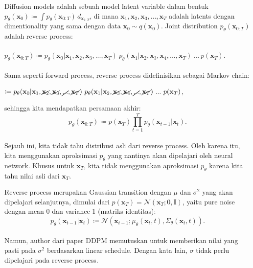 \documentclass{article}
\begin{document}
Diffusion models adalah sebuah model latent variable dalam bentuk $ p_\theta(\textbf{x}_0) \coloneq \int p_\theta(\textbf{x}_{0:T}) \,d_{\textbf{x}_{1:T}} $, di mana $ \textbf{x}_1,\textbf{x}_2,\textbf{x}_3,...,\textbf{x}_T $ adalah latents dengan dimentionality yang sama dengan data $ \textbf{x}_0 \sim q(\textbf{x}_0) $. Joint distribution $ p_\theta(\textbf{x}_{0:T}) $ adalah reverse process:
\\\\
$ p_\theta(\textbf{x}_{0:T}) \coloneq p_\theta(\textbf{x}_0|\textbf{x}_1,\textbf{x}_2,\textbf{x}_3,...,\textbf{x}_T) \ p_\theta(\textbf{x}_1|\textbf{x}_2,\textbf{x}_3,\textbf{x}_4,...,\textbf{x}_T) \ ... \  p(\textbf{x}_{T}) $.
\\\\
Sama seperti forward process, reverse process didefinisikan sebagai Markov chain:
\begin{tabbing}
\hspace{3.75em} $ \coloneq p_\theta(\textbf{x}_0|\textbf{x}_1,\cancel{\textbf{x}_2},\cancel{\textbf{x}_3},\cancel{...},\cancel{\textbf{x}_T}) \ p_\theta(\textbf{x}_1|\textbf{x}_2,\cancel{\textbf{x}_3},\cancel{\textbf{x}_4},\cancel{...},\cancel{\textbf{x}_T}) \ ... \  p(\textbf{x}_{T})  $,
\end{tabbing}
sehingga kita mendapatkan persamaan akhir:
\\
\begin{equation}
p_\theta(\textbf{x}_{0:T}) \coloneq p(\textbf{x}_T) \displaystyle \prod_{t=1}^{T} p_\theta(\textbf{x}_{t-1}|\textbf{x}_{t}).
\end{equation}
\\
Sejauh ini, kita tidak tahu distribusi asli dari reverse process. Oleh karena itu, kita menggunakan aproksimasi $ p_\theta $ yang nantinya akan dipelajari oleh neural network. Khusus untuk $ \textbf{x}_{T} $, kita tidak menggunakan aproksimasi $ p_\theta $ karena kita tahu nilai asli dari $ \textbf{x}_{T} $.

Reverse process merupakan Gaussian transition dengan $ \mu $ dan $ \sigma^2 $ yang akan dipelajari selanjutnya, dimulai dari $ p(\textbf{x}_T) = \mathscr{N}(\textbf{x}_T;0,\textbf{I}) $, yaitu pure noise dengan mean 0 dan variance 1 (matriks identitas):
\\
\begin{equation}
p_\theta(\textbf{x}_{t-1}|\textbf{x}_{t}) \coloneq \mathscr{N}(\textbf{x}_{t-1};\mu_\theta(\textbf{x}_{t},t),\Sigma_\theta(\textbf{x}_t,t)).
\end{equation}
\\
Namun, author dari paper DDPM memutuskan untuk memberikan nilai yang pasti pada $ \sigma^2 $ berdasarkan linear schedule. Dengan kata lain, $ \sigma $ tidak perlu dipelajari pada reverse process.
\end{document}
